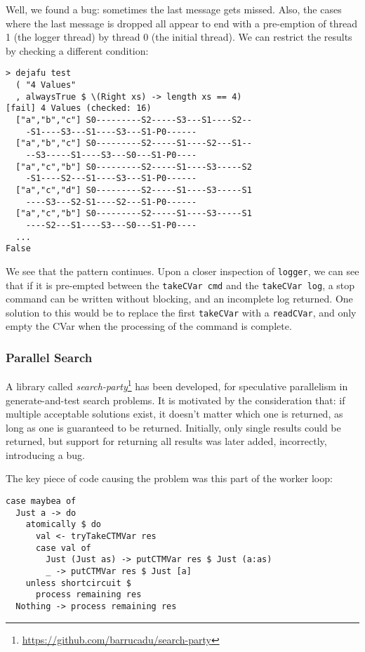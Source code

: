 Well, we found a bug: sometimes the last message gets missed. Also,
the cases where the last message is dropped all appear to end with a
pre-emption of thread 1 (the logger thread) by thread 0 (the initial
thread). We can restrict the results by checking a different
condition:

\begin{verbatim}
> dejafu test
  ( "4 Values"
  , alwaysTrue $ \(Right xs) -> length xs == 4)
[fail] 4 Values (checked: 16)
  ["a","b","c"] S0---------S2-----S3---S1----S2--
    -S1----S3---S1----S3---S1-P0------
  ["a","b","c"] S0---------S2-----S1----S2---S1--
    --S3-----S1----S3---S0---S1-P0----
  ["a","c","b"] S0---------S2-----S1----S3-----S2
    -S1----S2---S1----S3---S1-P0------
  ["a","c","d"] S0---------S2-----S1----S3-----S1
    ----S3---S2-S1----S2---S1-P0------
  ["a","c","b"] S0---------S2-----S1----S3-----S1
    ----S2---S1----S3---S0---S1-P0----
  ...
False
\end{verbatim}

We see that the pattern continues. Upon a closer inspection of
\texttt{logger}, we can see that if it is pre-empted between the
\texttt{takeCVar cmd} and the \texttt{takeCVar log}, a stop command
can be written without blocking, and an incomplete log returned. One
solution to this would be to replace the first \texttt{takeCVar} with
a \texttt{readCVar}, and only empty the CVar when the processing of
the command is complete.

\subsubsection*{Parallel Search}
\label{sec:prelims-dejafu-example-searchparty}

A library called
\textit{search-party}\footnote{\url{https://github.com/barrucadu/search-party}}
has been developed, for speculative parallelism in generate-and-test
search problems. It is motivated by the consideration that: if
multiple acceptable solutions exist, it doesn't matter which one is
returned, as long as one is guaranteed to be returned. Initially, only
single results could be returned, but support for returning all
results was later added, incorrectly, introducing a bug.

The key piece of code causing the problem was this part of the worker
loop:

\begin{verbatim}
case maybea of
  Just a -> do
    atomically $ do
      val <- tryTakeCTMVar res
      case val of
        Just (Just as) -> putCTMVar res $ Just (a:as)
        _ -> putCTMVar res $ Just [a]
    unless shortcircuit $
      process remaining res
  Nothing -> process remaining res
\end{verbatim}

